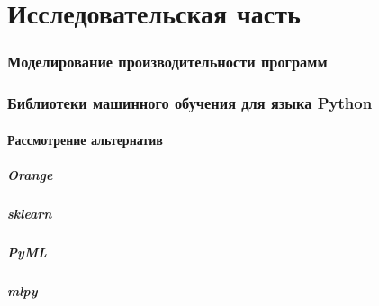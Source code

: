\part{Исследовательская часть}
\section{Моделирование производительности программ}
\section{Библиотеки машинного обучения для языка Python}
\subsection{Рассмотрение альтернатив}
\subsubsection{Orange}
\subsubsection{sklearn}
\subsubsection{PyML}
\subsubsection{mlpy}